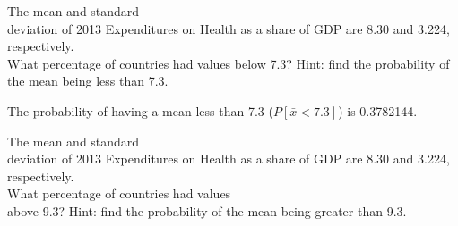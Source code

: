 \documentclass[11pt, chapterprefix=true]{scrbook}\usepackage[]{graphicx}\usepackage[]{color}
\begin{document}
\begin{exercises}








		\begin{exercise}  %


	  The mean and standard \\ deviation of 2013 Expenditures on Health as a share of GDP are 8.30 and 3.224, respectively.  \\ What percentage of countries had values below 7.3?   Hint: find the probability of the mean being less than 7.3.

	  \end{exercise}
	  \vspace{2cm}
	  \begin{solution}



    The probability of having a mean less than 7.3 ($P[ \bar{x} < 7.3 ]$) is 0.3782144.

	\end{solution}

			\begin{exercise}  %


	  The mean and standard \\ deviation of 2013 Expenditures on Health as a share of GDP are 8.30 and 3.224, respectively.  \\ What percentage of countries had values \\ above 9.3?   Hint: find the probability of the mean being greater than 9.3.

	  \end{exercise}
	  \vspace{2cm}
	  \begin{solution}




\end{solution}
\end{exercises}
\end{document}
